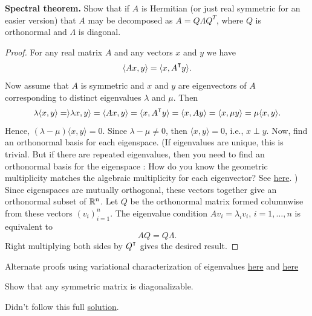 \begin{exercise} \label{exer:spectral_thrm}
\textbf{Spectral theorem.} Show that if $A$ is Hermitian (or just real symmetric for an easier version) that $A$ may be decomposed as $A = Q\Lambda Q^T$, where $Q$ is orthonormal and $\Lambda$ is diagonal. 
\end{exercise}

\begin{solution}
\begin{proof}
For any real matrix $A$ and any vectors $x$ and $y$ we have
$$
\langle Ax, y\rangle = \langle x, A^\T y\rangle.
$$
Now assume that $A$ is symmetric and $x$ and $y$ are eigenvectors of $A$ corresponding to distinct eigenvalues $\lambda$ and $\mu$. Then 
$$
\lambda \langle x, y\rangle = \rangle \lambda x, y\rangle = \langle Ax, y\rangle = \langle x, A^\T y\rangle = \langle x, A y\rangle = \langle x, \mu y \rangle = \mu\langle x, y \rangle.
$$
Hence, $(\lambda - \mu)\langle x, y\rangle = 0$. Since $\lambda - \mu \not= 0$, then $\langle x, y\rangle = 0$, i.e., $x \perp y$. 
Now, find an orthonormal basis for each eigenspace. (If eigenvalues are unique, this is trivial. But if there are repeated eigenvalues, then you need to find an orthonormal basis for the eigenspace : How do you know the geometric multiplicity matches the algebraic multiplicity for each eigenvector? See \href{https://math.stackexchange.com/questions/393149/for-a-symmetric-matrix-the-geometric-and-algebraic-multiplicities-are-equal}{here}. ) Since eigenspaces are mutually orthogonal, these vectors together give an orthonormal subset of $\mathbb{R}^n$. Let $Q$ be the orthonormal matrix formed columnwise from these vectors $(v_i)_{i=1}^n$. The eigenvalue condition $Av_i = \lambda_i v_i$, $i=1,\ldots,n$ is equivalent to
$$
AQ = Q\Lambda. 
$$
Right multiplying both sides by $Q^\T$ gives the desired result. 
\end{proof}

Alternate proofs using variational characterization of eigenvalues \href{https://mmids-textbook.github.io/chap04_specgraph/03_extremal/roch-mmids-specgraph-extremal.html}{here} and \href{https://terrytao.wordpress.com/2010/01/12/254a-notes-3a-eigenvalues-and-sums-of-hermitian-matrices/}{here}
\end{solution}

\begin{exercise}
Show that any symmetric matrix is diagonalizable.
\end{exercise}

\begin{solution}
Didn't follow this full \href{https://math.stackexchange.com/questions/482599/why-are-real-symmetric-matrices-diagonalizable}{solution}. 
\end{solution}


